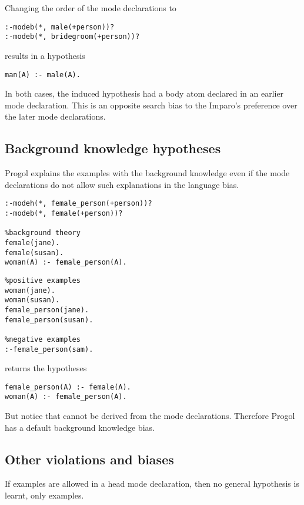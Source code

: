 Changing the order of the mode declarations to
\begin{lstlisting}
:-modeb(*, male(+person))?
:-modeb(*, bridegroom(+person))?
\end{lstlisting}
results in a hypothesis
\begin{lstlisting}
man(A) :- male(A).
\end{lstlisting}
In both cases, the induced hypothesis had a body atom declared in an earlier mode declaration. This is an opposite search bias to the Imparo's preference over the later mode declarations.

\subsection{Background knowledge hypotheses}
Progol explains the examples with the background knowledge even if the mode declarations do not allow such explanations in the language bias.

\begin{minipage}[t]{.60\textwidth}
\begin{lstlisting}
:-modeh(*, female_person(+person))?
:-modeb(*, female(+person))?

%background theory
female(jane).
female(susan).
woman(A) :- female_person(A).
\end{lstlisting}
\end{minipage}
\begin{minipage}[t]{.20\textwidth}
\begin{lstlisting}
%positive examples
woman(jane).
woman(susan).
female_person(jane).
female_person(susan).

%negative examples
:-female_person(sam).
\end{lstlisting}
\end{minipage}

returns the hypotheses
\begin{lstlisting}
female_person(A) :- female(A).
woman(A) :- female_person(A).
\end{lstlisting}
But notice that  cannot be derived from the mode declarations. Therefore Progol has a default background knowledge bias.

\subsection{Other violations and biases}
If examples are allowed in a head mode declaration, then no general hypothesis is learnt, only examples.
